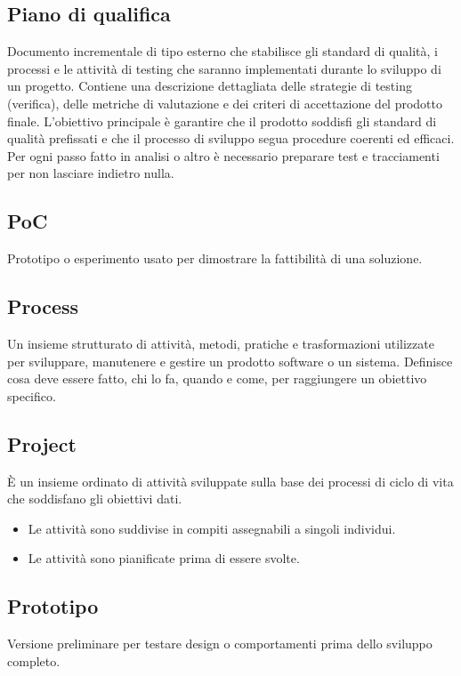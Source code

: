 \documentclass[a4paper,12pt]{article}
\begin{document}
\subsection{Piano di qualifica}
Documento incrementale di tipo esterno che stabilisce gli standard di qualità, i processi e le attività di testing che saranno implementati durante lo sviluppo di un progetto.  
Contiene una descrizione dettagliata delle strategie di testing (verifica), delle metriche di valutazione e dei criteri di accettazione del prodotto finale.  
L’obiettivo principale è garantire che il prodotto soddisfi gli standard di qualità prefissati e che il processo di sviluppo segua procedure coerenti ed efficaci.  
Per ogni passo fatto in analisi o altro è necessario preparare test e tracciamenti per non lasciare indietro nulla.

\subsection{PoC}
Prototipo o esperimento usato per dimostrare la fattibilità di una soluzione.

\subsection{Process}
Un insieme strutturato di attività, metodi, pratiche e trasformazioni utilizzate per sviluppare, manutenere e gestire un prodotto software o un sistema. Definisce cosa deve essere fatto, chi lo fa, quando e come, per raggiungere un obiettivo specifico.

\subsection{Project}
È un insieme ordinato di attività sviluppate sulla base dei processi di ciclo di vita che soddisfano gli obiettivi dati.
\begin{itemize}
\item Le attività sono suddivise in compiti assegnabili a singoli individui.
\item Le attività sono pianificate prima di essere svolte.
\end{itemize}

\subsection{Prototipo}
Versione preliminare per testare design o comportamenti prima dello sviluppo completo.
\end{document}
